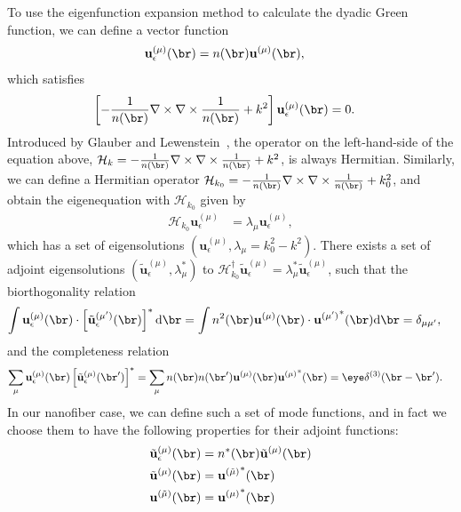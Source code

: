 \documentclass[]{report}
\begin{document}
To use the eigenfunction expansion method to calculate the dyadic Green function, we can define a vector function
\begin{align}
{\mathbf{u}}_\epsilon^{(\mu)}(\br) &= n(\br) \mathbf{u}^{(\mu)}(\br),
\end{align}
which satisfies
\begin{align}
\left[-\frac{1}{n(\br)}\nabla\times\nabla\times \frac{1}{n(\br)} + k^2\right]  {\mathbf{u}}_\epsilon^{(\mu)}(\br) &=0.
\end{align}
Introduced by Glauber and Lewenstein~\cite{Glauber1991}, the operator on the left-hand-side of the equation above, $\mathcal{H}_k = -\frac{1}{n(\br)}\nabla\times\nabla\times \frac{1}{n(\br)} + k^2$, is always Hermitian. Similarly, we can define a Hermitian operator $\mathcal{H}_{k_0} = -\frac{1}{n(\br)}\nabla\times\nabla\times \frac{1}{n(\br)} + k_0^2$, and obtain the eigenequation with $\mathcal{H}_{k_0}$ given by
\begin{align}
\mathcal{H}_{k_0} \mathbf{u}_\epsilon^{(\mu)} &= \lambda_\mu \mathbf{u}_\epsilon^{(\mu)},
\end{align}
which has a set of eigensolutions $ (\mathbf{u}_\epsilon^{(\mu)},\lambda_\mu=k_0^2-k^2) $. There exists a set of adjoint eigensolutions $ (\tilde{\mathbf{u}}_\epsilon^{(\mu)},\lambda_\mu^*) $ to $\mathcal{H}_{k_0}^\dagger \tilde{\mathbf{u}}_\epsilon^{(\mu)} = \lambda_\mu^* \tilde{\mathbf{u}}_\epsilon^{(\mu)}$, such that the biorthogonality relation
\begin{align}
\int \mathbf{u}_\epsilon^{(\mu)} (\br)\cdot \left[\tilde{\mathbf{u}}_\epsilon^{(\mu')}(\br) \right]^* \mathrm{d}\br &= \int n^2(\br) \mathbf{u}^{(\mu)} (\br)\cdot {\mathbf{u}^{(\mu')}}^*(\br) \mathrm{d}\br=\delta_{\mu\mu'},\label{eq:orthutrans}
\end{align}
and the completeness relation
\begin{align}
\sum_\mu \mathbf{u}_\epsilon^{(\mu)} (\br) \left[\tilde{\mathbf{u}}_\epsilon^{(\mu)}(\br') \right]^* &= \sum_\mu n(\br)n(\br') \mathbf{u}^{(\mu)} (\br) {\mathbf{u}^{(\mu)}}^*(\br) =\eye \delta^{(3)}(\br-\br'). 
\end{align}
In our nanofiber case, we can define such a set of mode functions, and in fact we choose them to have the following properties for their adjoint functions:
\begin{align}
\tilde{\mathbf{u}}_\epsilon^{(\mu)}(\br) &= n^*(\br) \tilde{\mathbf{u}}^{(\mu)}(\br)\\
\tilde{\mathbf{u}}^{(\mu)}(\br) &= {\mathbf{u}^{(\tilde{\mu})}}^*(\br)\\
{\mathbf{u}^{(\tilde{\mu})}}(\br) &= {\mathbf{u}^{(\mu)}}^*(\br)
\end{align}
\end{document}
